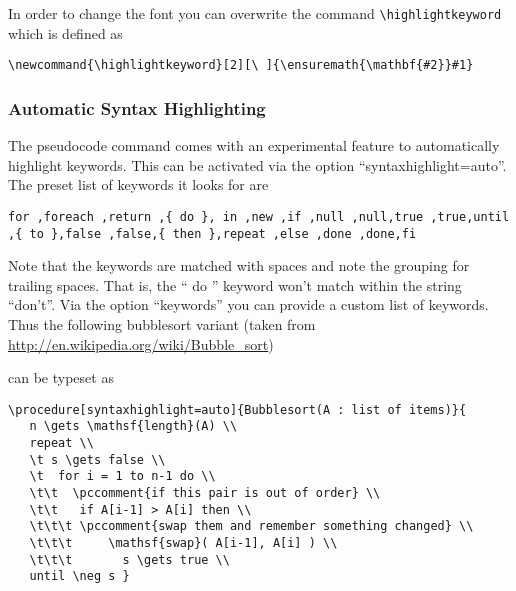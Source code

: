 \documentclass[a4paper]{report}
\begin{document}
In order to change the font you can overwrite the command \lstinline{\highlightkeyword} which is defined as
\begin{lstlisting}
\newcommand{\highlightkeyword}[2][\ ]{\ensuremath{\mathbf{#2}}#1}
\end{lstlisting}

\subsubsection{Automatic Syntax Highlighting}
The pseudocode command comes with an experimental feature to automatically highlight keywords. This can be activated via
the option \enquote{syntaxhighlight=auto}. The preset list of keywords it looks for are
\begin{lstlisting}
for ,foreach ,return ,{ do }, in ,new ,if ,null ,null,true ,true,until ,{ to },false ,false,{ then },repeat ,else ,done ,done,fi 
\end{lstlisting}
Note that the keywords are matched with spaces and note the grouping for trailing spaces. That is, the \enquote{ do } keyword won't match within the string \enquote{don't}.
Via the option \enquote{keywords} you can provide a custom list of keywords.
Thus the following bubblesort variant (taken from \url{http://en.wikipedia.org/wiki/Bubble_sort}) 
\begin{center}
\end{center}
can be typeset as
\begin{lstlisting}
\procedure[syntaxhighlight=auto]{Bubblesort(A : list of items)}{
   n \gets \mathsf{length}(A) \\
   repeat \\
   \t s \gets false \\
   \t  for i = 1 to n-1 do \\
   \t\t  \pccomment{if this pair is out of order} \\
   \t\t   if A[i-1] > A[i] then \\
   \t\t\t \pccomment{swap them and remember something changed} \\
   \t\t\t     \mathsf{swap}( A[i-1], A[i] ) \\
   \t\t\t       s \gets true \\
   until \neg s }
\end{lstlisting}
\end{document}
